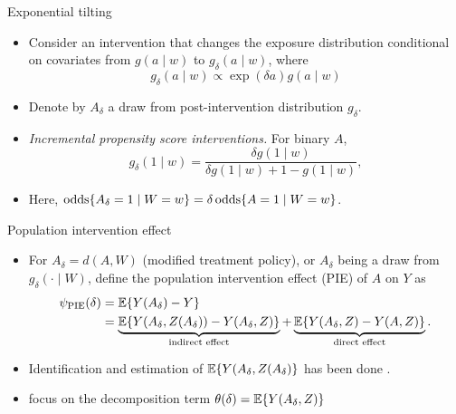 \documentclass{beamer}
\begin{document}

\begin{frame}{Exponential tilting}
  \begin{itemize}
  \item Consider an intervention that changes the exposure distribution
    conditional on covariates from $g(a\mid w)$ to
    $g_\delta(a\mid w)$, where
    \begin{equation*}
      g_\delta(a \mid w) \propto \exp(\delta a) g(a \mid w)
    \end{equation*}
  \item Denote by $A_\delta$ a draw from post-intervention distribution
    $g_\delta$.
  \end{itemize}
  \begin{example}
    \begin{itemize}
    \item \textit{Incremental propensity score interventions.} For binary $A$,
      \begin{equation*}
        g_\delta(1 \mid w) = \frac{\delta g(1 \mid w)}{\delta g(1 \mid w) + 1
          - g(1\mid w)},
      \end{equation*}

    \item Here, $\operatorname{odds}\{A_\delta= 1\mid W=w\} = \delta\operatorname{odds}\{A=1\mid W=w\}$.
    \end{itemize}
  \end{example}

\note{
}

\end{frame}


\begin{frame}{Population intervention effect}
  \begin{itemize}
  \item For $A_\delta= d(A,W)$ (modified treatment policy), or $A_\delta$
   being a draw from $g_\delta(\cdot\mid W)$, define the population
   intervention effect (PIE) of $A$ on $Y$ as
    \begin{align*}
        \psi_{\text{PIE}}(\delta) &= \mathbb{E}\{Y(A_\delta) - Y\}\\
                     &=\underbrace{\mathbb{E}\{Y(A_{\delta}, Z(A_{\delta})) -
          Y(A_\delta, Z)\}}_{\text{indirect effect}} +
          \underbrace{\mathbb{E}\{Y(A_\delta, Z) -
          Y(A, Z)\}}_{\text{direct effect}}.
    \end{align*}
  \item Identification and estimation of $\mathbb{E}\{Y(A_{\delta}, Z(A_{\delta})\}$
    has been done \cite[e.g.,][]{diaz2012population,kennedy2017nonparametric}.
  \item \cite{diaz2020causal} focus on the decomposition term
    $\theta(\delta) = \mathbb{E}\{Y(A_{\delta}, Z)\}$
  \end{itemize}

\note{
}

\end{frame}
\end{document}
